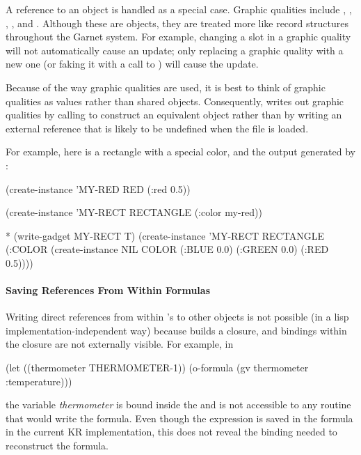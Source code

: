 A reference to an  object is handled as a
special case.  Graphic qualities include ,
, , , and
.  Although these are objects, they are
treated more like record structures throughout the Garnet system.
For example, changing a slot in a graphic quality will not
automatically cause an update; only replacing a graphic quality
with a new one (or faking it with a call to )
will cause the update.

Because of the way graphic qualities are used, it is best to
think of graphic qualities as values rather than shared objects.
Consequently,  writes out graphic qualities
by calling  to construct an equivalent object
rather than by writing an external reference that is likely to be
undefined when the file is loaded.

For example, here is a rectangle with a special color, and the output
generated by :
\begin{programexample}
(create-instance 'MY-RED RED
   (:red 0.5))

(create-instance 'MY-RECT RECTANGLE
   (:color my-red))

* (write-gadget MY-RECT T)
(create-instance 'MY-RECT RECTANGLE
   (:COLOR (create-instance NIL COLOR
              (:BLUE 0.0)
	      (:GREEN 0.0)
	      (:RED 0.5))))
\end{programexample}


\paragraph{Saving References From Within Formulas}
Writing direct references from within 's
to other objects is not possible (in a lisp implementation-independent
way) because  builds a closure, and bindings within the
closure are not externally visible.  For example, in
\begin{programexample}
(let ((thermometer THERMOMETER-1))
  (o-formula (gv thermometer :temperature)))
\end{programexample}
the variable {\it thermometer} is bound inside the  and is not
accessible to any routine that would write the formula.  Even though
the expression  is saved
in the formula in the current KR implementation, this does not
reveal the binding needed to reconstruct the formula.


